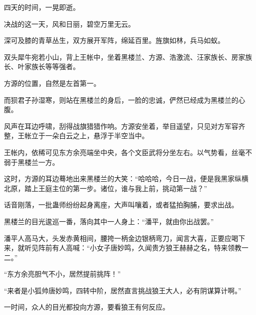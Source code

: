 \begin{this_body}
四天的时间，一晃即逝。

决战的这一天，风和日丽，碧空万里无云。

深可及膝的青草丛生，双方展开军阵，绵延百里。旌旗如林，兵马如蚁。

双头犀牛宛若小山，背上王帐中，坐着黑楼兰、方源、浩激流、汪家族长、房家族长、叶家族长等等强者。

方源的位置，自然是左首第一。

而狈君子孙湿寒，则站在黑楼兰的身后，一脸的忠诚，俨然已经成为黑楼兰的心腹。

风声在耳边呼啸，刮得战旗猎猎作响。方源安坐着，举目遥望，只见对方军容齐整，王帐立于一朵白云之上，悬浮于半空当中。

王帐内，依稀可见东方余亮端坐中央，各个文臣武将分坐左右。以气势看，丝毫不弱于黑楼兰一方。

这时，方源的耳边蓦地出来黑楼兰的大笑：“哈哈哈，今日一战，便是我黑家纵横北原，踏上王庭主位的第一步。诸位，谁与我上前，挑动第一战？”

话音刚落，一批蛊师纷纷起身离座，大声叫嚷着，或者猛拍胸脯，要求出战。

黑楼兰的目光逡巡一番，落向其中一人身上：“潘平，就由你出战罢。”

潘平人高马大，头发赤黄相间，腰挎一柄金边银柄弯刀，闻言大喜，正要应喝下来，就听见阵前有人高喊：“小女子唐妙鸣，久闻贵方狼王赫赫之名，特来领教一二。”

“东方余亮胆气不小，居然提前挑阵！”

“来者是小狐帅唐妙鸣，四转中阶，居然直言挑战狼王大人，必有阴谋算计啊。”

一时间，众人的目光都投向方源，要看狼王有何反应。

\end{this_body}

